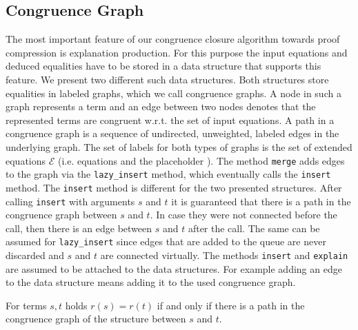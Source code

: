 \subsection*{Congruence Graph}
\label{sec:congruencegraph}
The most important feature of our congruence closure algorithm towards proof compression is explanation production.
For this purpose the input equations and deduced equalities have to be stored in a data structure that supports this feature.
We present two different such data structures.
Both structures store equalities in labeled graphs, which we call congruence graphs.
A node in such a graph represents a term and an edge between two nodes denotes that the represented terms are congruent w.r.t. the set of input equations.
A path in a congruence graph is a sequence of undirected, unweighted, labeled edges in the underlying graph.
The set of labels for both types of graphs is the set of extended equations $\mathcal{E}$ (i.e. equations and the placeholder \smiley).
The method \texttt{merge} adds edges to the graph via the \texttt{lazy\_insert} method, which eventually calls the \texttt{insert} method.
The \texttt{insert} method is different for the two presented structures.
After calling \texttt{insert} with arguments $s$ and $t$ it is guaranteed that there is a path in the congruence graph between $s$ and $t$.
In case they were not connected before the call, then there is an edge between $s$ and $t$ after the call.
The same can be assumed for \texttt{lazy\_insert} since edges that are added to the queue are never discarded and $s$ and $t$ are connected virtually.
The methods \texttt{insert} and \texttt{explain} are assumed to be attached to the data structures.
For example adding an edge to the data structure means adding it to the used congruence graph.

\begin{invariant}[Paths]

For terms $s, t$ holds $r(s) = r(t)$ if and only if there is a path in the congruence graph of the structure between $s$ and $t$.

\end{invariant}

